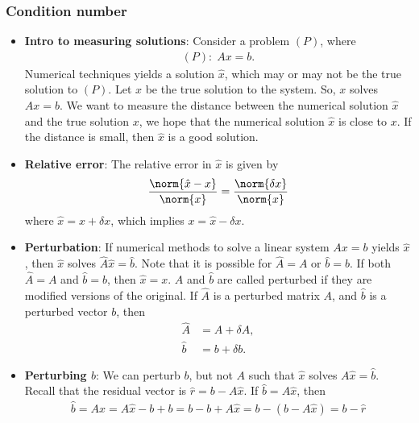 \documentclass{report}
\begin{document}
    \subsubsection{Condition number}
    \begin{itemize}
        \item \textbf{Intro to measuring solutions}: Consider a problem $(P)$, where
            \begin{align*}
                (P):\; Ax = b
            .\end{align*}
            Numerical techniques yields a solution $\hat{x}$, which may or may not be the true solution to $(P)$. Let $x$ be the true solution to the system. So, $x$ solves $Ax = b$. 
            \bigbreak \noindent 
            We want to measure the distance between the numerical solution $\hat{x} $ and the true solution $x$, we hope that the numerical solution $\hat{x}$ is close to $x$. If the distance is small, then $\hat{x}$ is a good solution.
        \item \textbf{Relative error}: The relative error in $\hat{x}$ is given by
            \begin{align*}
                \frac{\norm{\hat{x} - x}}{\norm{x}} = \frac{\norm{\delta x}}{\norm{x}}
            \end{align*}
            where $\hat{x} = x + \delta  x $, which implies $x = \hat{x} - \delta  x $.
        \item \textbf{Perturbation}: If numerical methods to solve a linear system $Ax = b$ yields $\hat{x}$, then $\hat{x}$ solves $\hat{A}\hat{x} = \hat{b}$. Note that it is possible for $\hat{A} = A$ or $\hat{b} = b $. If both $\hat{A} = A$ and $\hat{b} = b$, then $\hat{x} = x$.
            \bigbreak \noindent 
            $\hat{A}$ and $\hat{b}$ are called perturbed if they are modified versions of the original. If $\hat{A}$ is a perturbed matrix $A$, and $\hat{b}$ is a perturbed vector $b$, then
            \begin{align*}
                \hat{A} &= A + \delta A, \\
                \hat{b} &= b + \delta  b
            .\end{align*}
        \item \textbf{Perturbing $b$}: We can perturb $b$, but not $A$ such that $\hat{x}$ solves $A\hat{x} = \hat{b}$.
            \bigbreak \noindent 
            Recall that the residual vector is $\hat{r} = b - A\hat{x} $. If $\hat{b} = A\hat{x}$, then
            \begin{align*}
                \hat{b} = A\hat{x} = A\hat{x} - b + b = b - b + A\hat{x} = b - (b - A\hat{x}) = b - \hat{r}

\end{align*}
\end{itemize}
\end{document}
